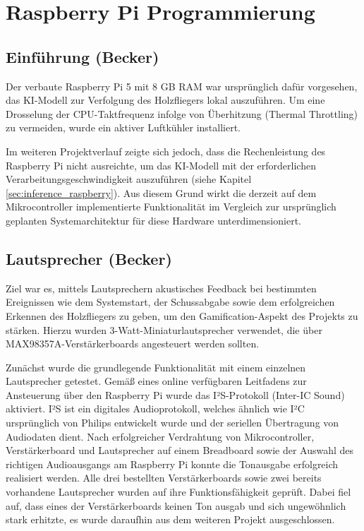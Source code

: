 \chapter{Raspberry Pi Programmierung}

\section{Einführung (Becker)}

Der verbaute Raspberry Pi 5 mit 8 GB RAM war ursprünglich dafür vorgesehen, das KI-Modell zur Verfolgung des Holzfliegers lokal auszuführen.
Um eine Drosselung der CPU-Taktfrequenz infolge von Überhitzung (Thermal Throttling) zu vermeiden, wurde ein aktiver Luftkühler installiert.

Im weiteren Projektverlauf zeigte sich jedoch, dass die Rechenleistung des Raspberry Pi nicht ausreichte, um das KI-Modell mit der erforderlichen Verarbeitungsgeschwindigkeit auszuführen (siehe Kapitel \ref{sec:inference_raspberry}).
Aus diesem Grund wirkt die derzeit auf dem Mikrocontroller implementierte Funktionalität im Vergleich zur ursprünglich geplanten Systemarchitektur für diese Hardware unterdimensioniert.

\section{Lautsprecher (Becker)}

Ziel war es, mittels Lautsprechern akustisches Feedback bei bestimmten Ereignissen wie dem Systemstart, der Schussabgabe sowie dem erfolgreichen Erkennen des Holzfliegers zu geben, um den Gamification-Aspekt des Projekts zu stärken. 
Hierzu wurden 3-Watt-Miniaturlautsprecher verwendet, die über MAX98357A-Verstärkerboards angesteuert werden sollten.

Zunächst wurde die grundlegende Funktionalität mit einem einzelnen Lautsprecher getestet. Gemäß eines online verfügbaren Leitfadens zur Ansteuerung über den Raspberry Pi \cite{raspberry_i2s} wurde das I²S-Protokoll (Inter-IC Sound) aktiviert. 
I²S ist ein digitales Audioprotokoll, welches ähnlich wie I²C ursprünglich von Philips entwickelt wurde und der seriellen Übertragung von Audiodaten dient.
Nach erfolgreicher Verdrahtung von Mikrocontroller, Verstärkerboard und Lautsprecher auf einem Breadboard sowie der Auswahl des richtigen Audioausgangs am Raspberry Pi konnte die Tonausgabe erfolgreich realisiert werden. 
Alle drei bestellten Verstärkerboards sowie zwei bereits vorhandene Lautsprecher wurden auf ihre Funktionsfähigkeit geprüft. 
Dabei fiel auf, dass eines der Verstärkerboards keinen Ton ausgab und sich ungewöhnlich stark erhitzte, es wurde daraufhin aus dem weiteren Projekt ausgeschlossen.

